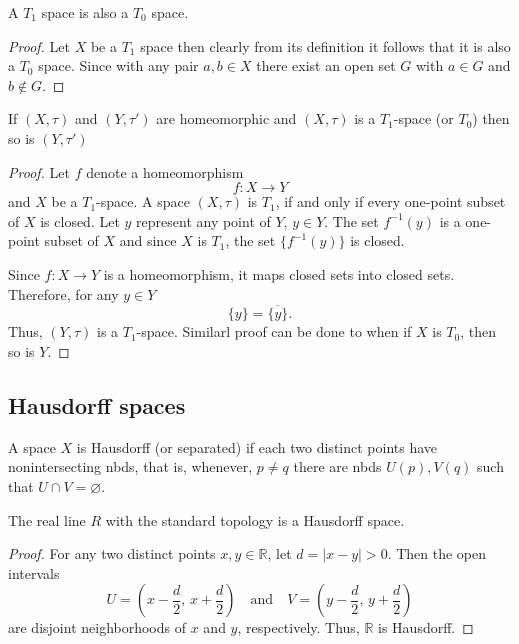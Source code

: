 \documentclass[12pt]{article} %
\begin{document}
\begin{theorem}\parencite{milewski1994topology}
    A $T_1$ space is also a $T_0$ space. \label{t1t0}
\end{theorem}
\begin{proof}
    Let $X$ be a $T_1$ space then clearly from its definition it follows that it is also a $T_0$ space. Since with any pair $a,b \in X$ there exist an open set $G$ with $a\in G$ and $b\notin G$.
\end{proof}

\begin{theorem}\parencite{milewski1994topology} If $(X,\tau)$ and $(Y,\tau')$ are homeomorphic  and $(X,\tau)$ is a $T_1$-space (or $T_0$) then so is  $(Y,\tau')$ 
\end{theorem}
\begin{proof}
    Let $f$ denote a homeomorphism
\[ f: X \to Y \]
and $X$ be a $T_1$-space. A space $(X, \tau)$ is $T_1$, if and only if every one-point subset of $X$ is closed.
Let $y$ represent any point of $Y$, $y \in Y$. The set $f^{-1}(y)$ is a one-point subset of $X$ and since $X$ is $T_1$, the set $\{f^{-1}(y)\}$ is closed.

Since $f: X \to Y$ is a homeomorphism, it maps closed sets into closed sets.
Therefore, for any $y \in Y$
\[ \{y\} = \overline{\{y\}}. \]
Thus, $(Y, \tau)$ is a $T_1$-space. Similarl proof can be done to when if $X$ is $T_0$, then so is $Y$.
\end{proof}


\subsection{Hausdorff spaces}
\begin{definition} \parencite{Dugundji1966} A space $X$ is Hausdorff (or separated) if each two distinct points have nonintersecting nbds, that is, whenever, $p \neq q$ there are nbds $U(p), V(q)$ such that $U \cap V = \varnothing$. 
\end{definition}

\begin{example} The real line $R$ with the standard topology is a Hausdorff space.
\end{example}
 \begin{proof}
 For any two distinct points \( x, y \in \mathbb{R} \), let \( d = |x - y| > 0 \).  
Then the open intervals  
\[ 
U = \left( x - \frac{d}{2}, \, x + \frac{d}{2} \right) \quad \text{and} \quad V = \left( y - \frac{d}{2}, \, y + \frac{d}{2} \right) 
\]  
are disjoint neighborhoods of \( x \) and \( y \), respectively.  
Thus, \( \mathbb{R} \) is Hausdorff.
    \end{proof}
\end{document}
